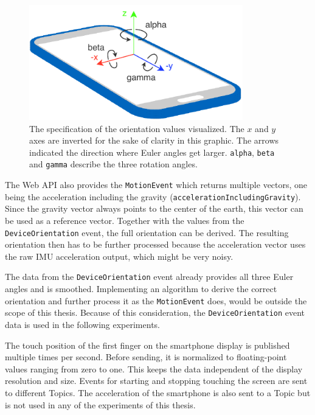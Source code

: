 \begin{figure}[H]
	\centering
	\includegraphics[height=5cm]{figures/implementation/webapi_device_orientation.pdf}
	\caption[Smart device coordinate system and orientation values]{The specification of the orientation values visualized. The \(x\) and \(y\) axes are inverted for the sake of clarity in this graphic. The arrows indicated the direction where Euler angles get larger. \lstinline{alpha}, \lstinline{beta} and \lstinline{gamma} describe the three rotation angles.}\label{fig:webapi-device-orientation}
\end{figure}

The Web \gls{API} also provides the \lstinline{MotionEvent} which returns multiple vectors, one being the acceleration including the gravity (\lstinline{accelerationIncludingGravity}). Since the gravity vector always points to the center of the earth, this vector can be used as a reference vector. Together with the values from the \lstinline{DeviceOrientation} event, the full orientation can be derived. The resulting orientation then has to be further processed because the acceleration vector uses the raw \gls{IMU} acceleration output, which might be very noisy.

The data from the \lstinline{DeviceOrientation} event already provides all three Euler angles and is smoothed. Implementing an algorithm to derive the correct orientation and further process it as the \lstinline{MotionEvent} does, would be outside the scope of this thesis. Because of this consideration, the \lstinline{DeviceOrientation} event data is used in the following experiments.

The touch position of the first finger on the smartphone display is published multiple times per second. Before sending, it is normalized to floating-point values ranging from zero to one. This keeps the data independent of the display resolution and size. Events for starting and stopping touching the screen are sent to different Topics. The acceleration of the smartphone is also sent to a Topic but is not used in any of the experiments of this thesis.


